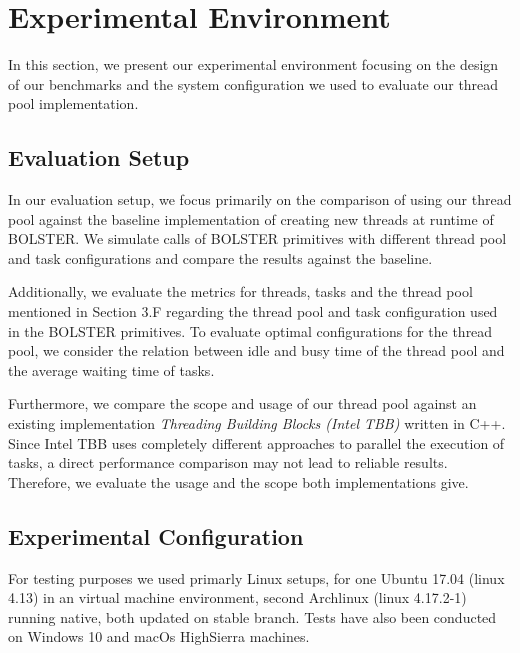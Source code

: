 \documentclass[conference]{IEEEtran}
\begin{document}
\section{Experimental Environment}
In this section, we present our experimental environment focusing on the design of our benchmarks and the system configuration we used to evaluate our thread pool implementation.

\subsection{Evaluation Setup}
In our evaluation setup, we focus primarily on the comparison of using our thread pool against the baseline implementation of creating new threads at runtime of BOLSTER. We simulate calls of BOLSTER primitives with different thread pool and task configurations and compare the results against the baseline.

Additionally, we evaluate the metrics for threads, tasks and the thread pool mentioned in Section 3.F regarding the thread pool and task configuration used in the BOLSTER primitives. To evaluate optimal configurations for the thread pool, we consider the relation between idle and busy time of the thread pool and the average waiting time of tasks.

Furthermore, we compare the scope and usage of our thread pool against an existing implementation \emph{Threading Building Blocks (Intel TBB)} \cite{kim2011multicore} written in C++. Since Intel TBB uses completely different approaches to parallel the execution of tasks, a direct performance comparison may not lead to reliable results. Therefore, we evaluate the usage and the scope both implementations give.

\subsection{Experimental Configuration}

For testing purposes we used primarly Linux setups, for one Ubuntu 17.04
(linux 4.13) in an virtual machine environment, second Archlinux (linux
4.17.2-1) running native, both updated on stable branch. Tests have also been
conducted on Windows 10 and macOs HighSierra machines.
\end{document}
